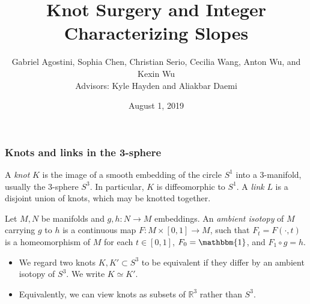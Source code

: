 \documentclass{beamer}
\title[Integer Characterizing Slopes]{Knot Surgery and Integer Characterizing Slopes}
\author[Agostini, Chen, Serio, Wang, Wu, and Wu\;\;\;]{Gabriel Agostini, Sophia Chen, Christian Serio, Cecilia Wang, Anton Wu, and Kexin Wu\\
Advisors: Kyle Hayden and Aliakbar Daemi}
\institute{Columbia University}
\date{August 1, 2019}
\theoremstyle{ex}
\theoremstyle{rem}
\begin{document}
	
	\begin{frame}
		\titlepage
	\end{frame}

	\begin{frame}
		\frametitle{Knots and links in the 3-sphere}
		\begin{definition}
			A \textit{knot} $K$ is the image of a smooth embedding of the circle $S^1$ into a 3-manifold, usually the $3$-sphere $S^3$. In particular, $K$ is diffeomorphic to $S^1$. A \textit{link} $L$ is a disjoint union of knots, which may be knotted together.
		\end{definition}
		\begin{definition}
		Let $M,N$ be manifolds and $g,h\!:N\to M$ embeddings. An \textit{ambient isotopy} of $M$ carrying $g$ to $h$ is a continuous map $F\!:M\times[0,1]\to M$, such that $F_t=F(\cdot,t)$ is a homeomorphism of $M$ for each $t\in[0,1]$,  $F_0=\mathbbm{1}$, and $F_1\circ g = h$.
		\end{definition}
		\begin{itemize}
		\item We regard two knots $K,K'\subset S^3$ to be equivalent if they differ by an ambient isotopy of $S^3$. We write $K\simeq K'$.	
		\item Equivalently, we can view knots as subsets of $\mathbb{R}^3$ rather than $S^3$.
		
		\end{itemize}
	\end{frame}
\end{document}
